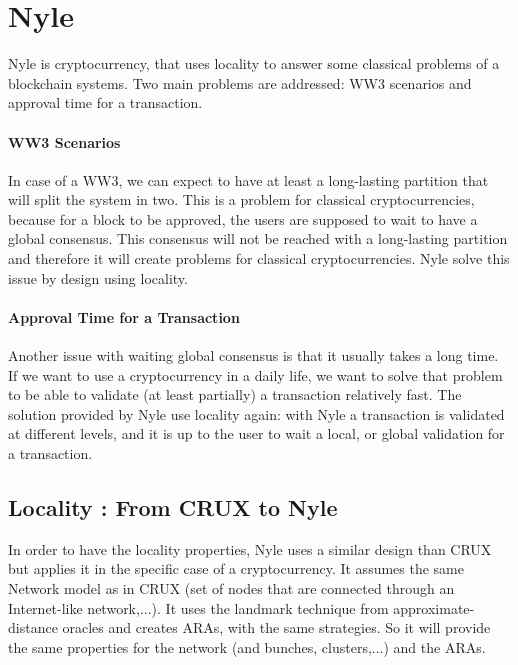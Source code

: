 \documentclass[a4paper,11pt,oneside]{report}
\begin{document}
\section{Nyle}

Nyle is cryptocurrency, that uses locality to answer some classical problems of
a blockchain systems. Two main problems are addressed: WW3 scenarios and
approval time for a transaction.
 
 \paragraph{WW3 Scenarios} \label{WW3} In case of a WW3, we can expect to have
 at least a long-lasting partition that will split the system in two. This is a
 problem for classical cryptocurrencies, because for a block to be approved,
 the users are supposed to wait to have a global consensus. This consensus will
 not be reached with a long-lasting partition and therefore it will create
 problems for classical cryptocurrencies. Nyle solve this issue by design using
 locality.

\paragraph{Approval Time for a Transaction} \label{approve_time} Another issue
with waiting global consensus is that it usually takes a long time. If we want
to use a cryptocurrency in a daily life, we want to solve that problem to be
able to validate (at least partially) a transaction relatively fast. The
solution provided by Nyle use locality again: with Nyle a transaction is
validated at different levels, and it is up to the user to wait a local, or
global validation for a transaction.

\subsection{Locality : From CRUX to Nyle}

In order to have the locality properties, Nyle uses a similar design than CRUX
but applies it in the specific case of a cryptocurrency. It assumes the same
Network model as in CRUX (set of nodes that are connected through an
Internet-like network,...). It uses the landmark technique from
approximate-distance oracles and creates ARAs, with the same strategies. So it
will provide the same properties for the network (and bunches, clusters,...)
and the ARAs.
\end{document}
